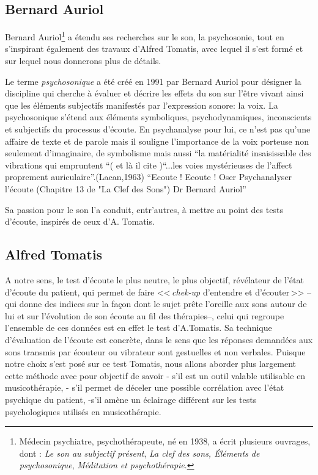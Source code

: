  \subsection{Bernard Auriol}

Bernard Auriol\footnote{Médecin psychiatre, psychothérapeute, 
	né en 1938, a écrit plusieurs ouvrages, dont : \textsl{Le son au subjectif présent}, \textsl{La clef des sons, Éléments de psychosonique}, \textsl{Méditation et
  psychothérapie}.}
a étendu ses recherches sur le son, la psychosonie, 
tout en s'inspirant également des
travaux d'Alfred Tomatis, avec lequel il s'est formé et sur lequel
nous donnerons plus de détails.

Le terme \emph{psychosonique} a été créé en 1991 par Bernard Auriol pour
désigner la discipline qui cherche à évaluer et décrire les effets du
son sur l'être vivant ainsi que les éléments
subjectifs manifestés par l'expression sonore:  la
voix. 
La psychosonique s'étend aux éléments
symboliques, psychodynamiques, inconscients et subjectifs du processus
d'écoute. En psychanalyse pour lui, ce n'est pas qu'une affaire de
texte et de parole mais il souligne l'importance de la voix porteuse non seulement
d'imaginaire, de symbolisme mais aussi ``la matérialité insaisissable
des vibrations qui empruntent ``( et là il cite )``...les voies mystérieuses de
l'affect proprement auriculaire''.(Lacan,1963)
``Ecoute ! Ecoute !
Oser Psychanalyser l'écoute
(Chapitre 13 de "La Clef des Sons")
Dr Bernard Auriol''



Sa passion pour le son l'a conduit, entr'autres, à mettre au point des tests
d'écoute, inspirés de ceux d'A. Tomatis.
       
\subsection{Alfred Tomatis}


A notre sens, le  test d'écoute le plus neutre, le plus objectif, révélateur de l'état d'écoute
du patient, qui permet de faire <<\,\emph{chek-up} d'entendre et d'écouter\,>>
 --qui donne des indices sur la façon dont le sujet prête l'oreille
 aux sons autour de lui et sur l'évolution de son écoute au fil des thérapies--,
celui qui regroupe l'ensemble de ces
données est en effet le test d'A.Tomatis.
Sa technique d'évaluation
de l'écoute est concrète, dans le sens que les réponses demandées aux sons
transmis par écouteur ou vibrateur sont gestuelles et non verbales. 
Puisque notre choix s'est posé sur ce test Tomatis, nous allons
aborder plus largement cette méthode avec pour objectif de savoir
- s'il est un outil valable utilisable en musicothérapie,
- s'il permet de déceler une possible corrélation avec l'état
psychique du patient,
-s'il amène un éclairage différent sur les tests psychologiques
utilisés en musicothérapie.
